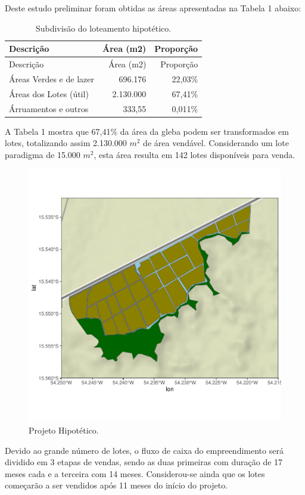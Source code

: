 \documentclass[
  10pt,
  a4paper]{article}
\begin{document}
Deste estudo preliminar foram obtidas as áreas apresentadas na Tabela 1
abaixo:

\begin{longtable}[]{@{}lrr@{}}
\caption{Subdivisão do loteamento hipotético.}\tabularnewline
\toprule\noalign{}
Descrição & Área (m2) & Proporção \\
\midrule\noalign{}
\endfirsthead
\toprule\noalign{}
Descrição & Área (m2) & Proporção \\
\midrule\noalign{}
\endhead
\bottomrule\noalign{}
\endlastfoot
Áreas Verdes e de lazer & 696.176 & 22,03\% \\
Áreas dos Lotes (útil) & 2.130.000 & 67,41\% \\
Árruamentos e outros & 333,55 & 0,011\% \\
\end{longtable}

A Tabela 1 mostra que 67,41\% da área da gleba podem ser transformados
em lotes, totalizando assim 2.130.000 \(m^2\) de área vendável.
Considerando um lote paradigma de 15.000 \(m^2\), esta área resulta em
142 lotes disponíveis para venda.

\begin{figure}[H]

{\centering \includegraphics[width=0.7\linewidth]{images/PH-1} 

}

\caption{Projeto Hipotético.}\label{fig:PH}
\end{figure}

Devido ao grande número de lotes, o fluxo de caixa do empreendimento
será dividido em 3 etapas de vendas, sendo as duas primeiras com duração
de 17 meses cada e a terceira com 14 meses. Considerou-se ainda que os
lotes começarão a ser vendidos após 11 meses do início do projeto.
\end{document}
